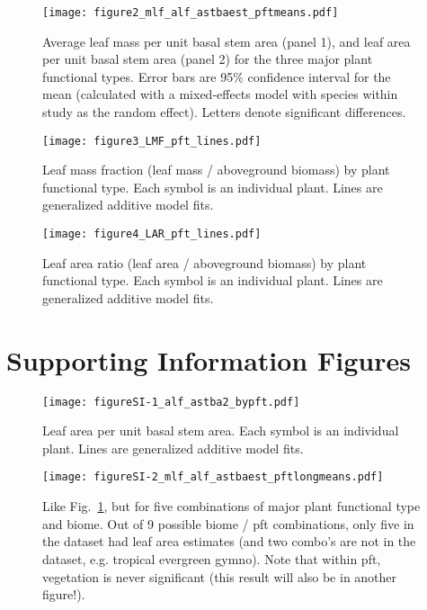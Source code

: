 \documentclass[a4paper]{article}
\begin{document}
\begin{figure}[h!]
    \centering
    \texttt{[image: figure2\_mlf\_alf\_astbaest\_pftmeans.pdf]}
    \caption{Average leaf mass per unit basal stem area (panel 1), and leaf area per unit basal stem area (panel 2) for the three major plant functional types. Error bars are 95\% confidence interval for the mean (calculated with a mixed-effects model with species within study as the random effect). Letters denote significant differences. }
    \label{fig:figure2}
\end{figure}


\begin{figure}[h!]
    \centering
    \texttt{[image: figure3\_LMF\_pft\_lines.pdf]}
    \caption{Leaf mass fraction (leaf mass / aboveground biomass) by plant functional type. Each symbol is an individual plant. Lines are generalized additive model fits.}
    \label{fig:figure3}
\end{figure}

\begin{figure}[h!]
    \centering
    \texttt{[image: figure4\_LAR\_pft\_lines.pdf]}
    \caption{Leaf area ratio (leaf area / aboveground biomass) by plant functional type. Each symbol is an individual plant. Lines are generalized additive model fits.}
    \label{fig:figure4}
\end{figure}



\section{Supporting Information Figures}

\begin{figure}[h!]
    \centering
    \texttt{[image: figureSI-1\_alf\_astba2\_bypft.pdf]}
    \caption{Leaf area per unit basal stem area. Each symbol is an individual plant. Lines are generalized additive model fits.}
    \label{fig:figureSI1}
\end{figure}

\begin{figure}[h!]
    \centering
    \texttt{[image: figureSI-2\_mlf\_alf\_astbaest\_pftlongmeans.pdf]}
    \caption{Like Fig.~\ref{fig:figure2}, but for five combinations of major plant functional type and biome. Out of 9 possible biome / pft combinations, only five in the dataset had leaf area estimates (and two combo's are not in the dataset, e.g. tropical evergreen gymno). Note that within pft, vegetation is never significant (this result will also be in another figure!).}
    \label{fig:figureSI2}
\end{figure}
\end{document}
